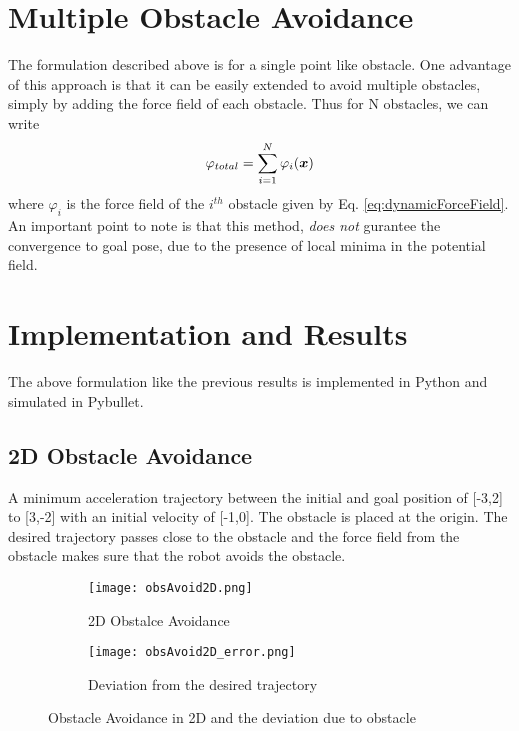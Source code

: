 \section{Multiple Obstacle Avoidance}
The formulation described above is for a single point like obstacle. One advantage of this approach is that it can be 
easily extended to avoid multiple obstacles, simply by adding the force field of each obstacle. 
Thus for N obstacles, we can write
\begin{equation}
    \varphi_{total} = \sum\limits_{i=1}^N \varphi_{i}(\boldsymbol{x})
\end{equation}
where $\varphi_{i}$ is the force field of the $i^{th}$ obstacle given by Eq. \ref{eq:dynamicForceField}.
An important point to note is that this method, \textit{does not} gurantee the convergence to goal pose,
due to the presence of local minima in the potential field.

\section{Implementation and Results}
The above formulation like the previous results is implemented in Python and simulated in Pybullet.

\subsection{2D Obstacle Avoidance}
A minimum acceleration trajectory between the initial and goal position of [-3,2] to [3,-2] with an initial velocity of [-1,0]. The obstacle
is placed at the origin. The desired trajectory passes close to the obstacle and the force field from the obstacle makes sure that
the robot avoids the obstacle.

\begin{figure}[h]
    \centering
    \begin{subfigure}{0.5\textwidth}
        \texttt{[image: obsAvoid2D.png]}
        \caption{2D Obstalce Avoidance}
        \label{fig:obsAvoid2D}
    \end{subfigure}%
    \begin{subfigure}{0.5\textwidth}
        \centering
        \texttt{[image: obsAvoid2D\_error.png]}
        \caption{Deviation from the desired trajectory}
        \label{fig:obsAvoid2D_error}
    \end{subfigure}
    \caption{Obstacle Avoidance in 2D and the deviation due to obstacle}
    \label{fig:obsAvoid2D_total}
\end{figure}

